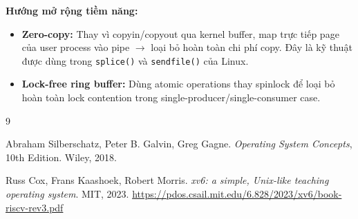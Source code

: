\documentclass[12pt,a4paper]{article}
\newcommand{\code}[1]{\texttt{#1}}
\newcommand{\tightlist}{\setlength{\itemsep}{2pt}\setlength{\parskip}{0pt}}
\begin{document}
\textbf{Hướng mở rộng tiềm năng:}
\begin{itemize}\tightlist
    \item \textbf{Zero-copy:} Thay vì copyin/copyout qua kernel buffer, map trực tiếp
    page của user process vào pipe $\to$ loại bỏ hoàn toàn chi phí copy. Đây là kỹ
    thuật được dùng trong \code{splice()} và \code{sendfile()} của Linux.
    \item \textbf{Lock-free ring buffer:} Dùng atomic operations thay spinlock để loại
    bỏ hoàn toàn lock contention trong single-producer/single-consumer case.
\end{itemize}

\begin{thebibliography}{9}

Abraham Silberschatz, Peter B. Galvin, Greg Gagne.
\textit{Operating System Concepts}, 10th Edition.
Wiley, 2018.

Russ Cox, Frans Kaashoek, Robert Morris.
\textit{xv6: a simple, Unix-like teaching operating system}.
MIT, 2023.
\url{https://pdos.csail.mit.edu/6.828/2023/xv6/book-riscv-rev3.pdf}

\end{thebibliography}
\end{document}
